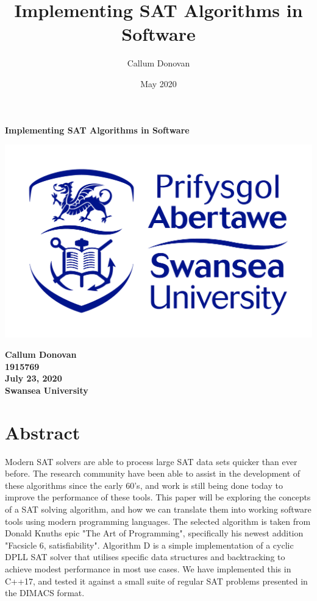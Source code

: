 \documentclass{article}
\title{\bfseries Implementing SAT Algorithms in Software}
\author{Callum Donovan}
\date{May 2020}
\begin{document}
\begin{titlepage}
    \begin{center}
        \Large{\bfseries Implementing SAT Algorithms in Software} \\
        \vspace{4cm}
        \begin{center}
            \includegraphics[scale=0.2]{swan.jpg}
        \end{center}
        \vspace*{\fill}
        \bfseries{\large Callum Donovan \\
            1915769 \\
            July 23, 2020 \\
            Swansea University \\}
    \end{center}
\end{titlepage}

\section{Abstract}
Modern SAT solvers are able to process large SAT data sets quicker than ever before. The research community have been able to assist in the
development of these algorithms since the early 60's, and work is still being done today to improve the performance of these tools. This
paper will be exploring the concepts of a SAT solving algorithm, and how we can translate them into working software tools using modern
programming languages. The selected algorithm is taken from Donald Knuths epic "The Art of Programming", specifically his newest addition "Facsicle 6,
satisfiability". Algorithm D is a simple implementation of a cyclic DPLL SAT solver that utilises specific data structures and backtracking to achieve
modest performance in most use cases. We have implemented this in C++17, and tested it against a small suite of regular SAT problems presented in the DIMACS
format.
\end{document}
